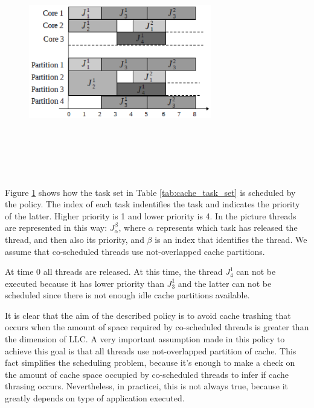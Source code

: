 \begin{description}
\begin{figure}[htbp]
\centering
{
\includegraphics[width=8cm,height=10cm, keepaspectratio]{images/schedule.eps}
}
\caption{}
\label{fig:sched_example}
\end{figure}

Figure \ref{fig:sched_example} shows how the task set in Table \ref{tab:cache_task_set} is scheduled by the policy. The index of each task 
indentifies the task and indicates the priority of the latter. Higher priority is 1 and lower priority is 4. In the picture threads are represented in this 
way: $J_{\alpha}^\beta$, where $\alpha$ represents which task has released the thread, and then also its priority, and $\beta$ is an index that identifies 
the thread. We assume that co-scheduled threads use not-overlapped cache partitions.

At time 0 all threads are released. At this time, the thread $J_{4}^1$ can not be executed because it has lower priority than $J_{3}^1$ and the latter can 
not be scheduled since there is not enough idle cache partitions available.

It is clear that the aim of the described policy is to avoid cache trashing that occurs when the amount of space required by co-scheduled threads is greater 
than the dimension of LLC. A very important assumption made in this policy to achieve this goal is that all threads use not-overlapped 
partition of cache. This fact simplifies the scheduling problem, because it's enough to make a check on the amount of cache space occupied by co-scheduled 
threads to infer if cache thrasing occurs. Nevertheless, in practicei, this is not always true, because it greatly depends on type of application executed.



\end{description}
